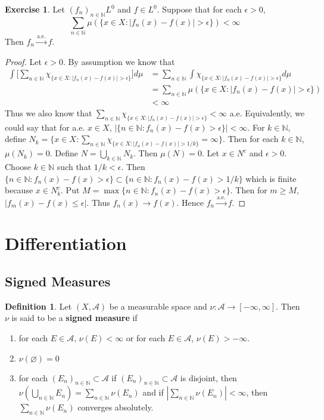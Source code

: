 \documentclass[12pt]{amsart}
\theoremstyle{definition}
\newtheorem{defn}[definition]{Definition}
\newtheorem{ex}[definition]{Exercise}
\newcommand{\ep}{\epsilon}
\newcommand{\N}{\mathbb{N}}
\newcommand{\MA}{\mathcal{A}}
\newcommand{\convt}[1]{\xrightarrow{\text{#1}}}
\begin{document}
	
	\begin{ex}
		Let $(f_n)_{n \in \N} L^0$ and $f \in L^0$. Suppose that for each $\ep >0$, $$\sum_{n \in \N}\mu(\{x \in X: |f_n(x)-f(x)| > \ep\}) < \infty$$
		Then $f_n \convt{a.e.} f$.
	\end{ex}
	
	\begin{proof}
		Let $\ep>0$. By assumption we know that
		\begin{align*}
			\int \bigg[ \sum_{n \in \N}\chi_{\{x \in X: |f_n(x)-f(x)| > \ep\}}\bigg] d \mu 
			&= \sum_{n \in \N}\int \chi_{\{x \in X: |f_n(x)-f(x)| > \ep\}}d \mu\\
			&=\sum_{n \in \N}\mu(\{x \in X: |f_n(x)-f(x)| > \ep\})\\
			& < \infty
		\end{align*}
		Thus we also know that $\sum_{n \in \N}\chi_{\{x \in X: |f_n(x)-f(x)| > \ep\}} < \infty$ a.e. Equivalently, we could say that for a.e. $x \in X$, $|\{n \in \N: f_n(x) - f(x) > \ep\}| < \infty$. For $k \in \N$, define $N_k = \{x \in X: \sum_{n \in \N}\chi_{\{x \in X: |f_n(x)-f(x)| > 1/k\}} = \infty\}$. Then for each $k \in \N$, $\mu(N_k) = 0$. Define $N = \bigcup_{k \in \N} N_k$. Then $\mu(N) = 0$. Let $x \in N^c$ and $\ep > 0$. Choose $k \in \N$ such that $1/k < \ep$. Then $\{n \in \N: f_n(x) - f(x) > \ep\} \subset \{n \in \N: f_n(x) - f(x) > 1/k\}$ which is finite because $x \in N_k^c$. Put $M = \max\{n \in \N: f_n(x) - f(x) > \ep\}$. Then for $m \geq M$, $|f_m(x) - f(x) \leq \ep|$. Thus $f_n(x) \rightarrow f(x)$. Hence $f_n \convt{a.e.} f$.
	\end{proof}
	
	\section{Differentiation}
	
	\subsection{Signed Measures}
	
	\begin{defn}
		Let $(X, \MA)$ be a measurable space and $\nu : \MA \rightarrow [-\infty, \infty]$. Then $\nu$ is said to be a \textbf{signed measure} if 
		\begin{enumerate}
			\item for each $E \in \MA$, $\nu(E) < \infty$ or for each $E \in \MA$, $\nu(E) > -\infty$.
			\item $\nu(\varnothing) = 0$
			\item for each $(E_n)_{n \in \N} \subset \MA$ if $(E_n)_{n \in \N} \subset \MA$ is disjoint, then $\nu(\bigcup\limits_{n \in \N} E_n) = \sum\limits_{n \in \N} \nu(E_n)$ and if $|\sum\limits_{n \in \N} \nu(E_n)| < \infty$, then $\sum\limits_{n \in \N} \nu(E_n)$ converges absolutely.
		\end{enumerate}
	\end{defn}
	
\end{document}
